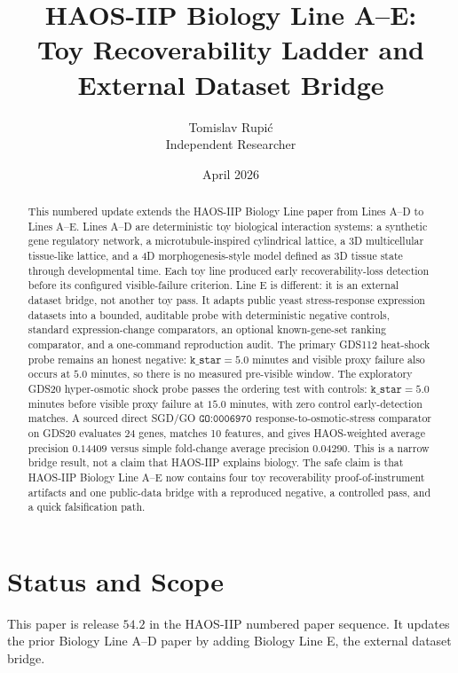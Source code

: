 \documentclass[11pt]{article}
\title{HAOS-IIP Biology Line A--E:\\Toy Recoverability Ladder and External Dataset Bridge}
\author{Tomislav Rupi\'c \\ Independent Researcher}
\date{April 2026}
\begin{document}
\maketitle

\begin{abstract}
This numbered update extends the HAOS-IIP Biology Line paper from Lines A--D to Lines A--E. Lines A--D are deterministic toy biological interaction systems: a synthetic gene regulatory network, a microtubule-inspired cylindrical lattice, a 3D multicellular tissue-like lattice, and a 4D morphogenesis-style model defined as 3D tissue state through developmental time. Each toy line produced early recoverability-loss detection before its configured visible-failure criterion. Line E is different: it is an external dataset bridge, not another toy pass. It adapts public yeast stress-response expression datasets into a bounded, auditable probe with deterministic negative controls, standard expression-change comparators, an optional known-gene-set ranking comparator, and a one-command reproduction audit. The primary GDS112 heat-shock probe remains an honest negative: \(\texttt{k\_star}=5.0\) minutes and visible proxy failure also occurs at \(5.0\) minutes, so there is no measured pre-visible window. The exploratory GDS20 hyper-osmotic shock probe passes the ordering test with controls: \(\texttt{k\_star}=5.0\) minutes before visible proxy failure at \(15.0\) minutes, with zero control early-detection matches. A sourced direct SGD/GO \(\texttt{GO:0006970}\) response-to-osmotic-stress comparator on GDS20 evaluates 24 genes, matches 10 features, and gives HAOS-weighted average precision \(0.14409\) versus simple fold-change average precision \(0.04290\). This is a narrow bridge result, not a claim that HAOS-IIP explains biology. The safe claim is that HAOS-IIP Biology Line A--E now contains four toy recoverability proof-of-instrument artifacts and one public-data bridge with a reproduced negative, a controlled pass, and a quick falsification path.
\end{abstract}

\tableofcontents

\section{Status and Scope}

This paper is release \(54.2\) in the HAOS-IIP numbered paper sequence. It updates the prior Biology Line A--D paper by adding Biology Line E, the external dataset bridge.
\end{document}
